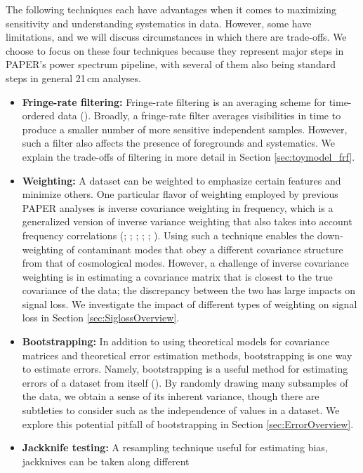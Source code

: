 \documentclass[preprint2,numberedappendix,tighten]{aastex6}
\begin{document}
The following techniques each have advantages when it comes to maximizing sensitivity and understanding systematics in 
data. However, some have limitations, and we will discuss circumstances in which there are trade-offs. We choose to focus on 
these four techniques because they represent major steps in PAPER's power spectrum pipeline, with several of them also 
being standard steps in general 21\,cm analyses.
\begin{itemize}
\item \textbf{Fringe-rate filtering:} Fringe-rate filtering is an averaging scheme for time-ordered data 
(\citealt{parsons_et_al2016}). Broadly, a fringe-rate filter averages visibilities in time to produce a smaller number of more sensitive 
independent samples. However, such a filter also affects the presence 
of foregrounds and systematics. We explain the trade-offs of filtering in more detail in Section \ref{sec:toymodel_frf}.
\item \textbf{Weighting:} A dataset can be weighted to emphasize certain features and minimize others. One particular flavor of 
weighting employed by previous PAPER analyses is inverse covariance weighting in frequency, which is a generalized version of inverse variance 
weighting that also takes into account frequency correlations (\citealt{liu_tegmark2011}; \citealt{dillon_et_al2013a}; \citealt{liu_et_al2014a}; \citealt{liu_et_al2014b}; \citealt{dillon_et_al2014}; \citealt{dillon_et_al2015}). Using such a technique enables the down-weighting of contaminant modes that obey a different covariance structure from that of cosmological modes. However, a challenge of inverse covariance 
weighting is in estimating a covariance matrix that is closest to the true covariance of the data; the discrepancy between the two has large impacts on signal loss. We investigate the impact of different types of weighting on signal loss in Section \ref{sec:SiglossOverview}.
\item \textbf{Bootstrapping:} In addition to using theoretical models for covariance matrices and theoretical error estimation 
methods, bootstrapping is one way to estimate errors. Namely, bootstrapping is a useful method for estimating errors of a dataset from 
itself (\citealt{andrae2010}). By randomly drawing many subsamples of the data, we obtain a sense of its inherent variance, though there are subtleties to 
consider such as the independence of values in a dataset. We explore this potential pitfall of bootstrapping in Section \ref{sec:ErrorOverview}.
\item \textbf{Jackknife testing:} A resampling technique useful for estimating bias, jackknives can be taken along different 

\end{itemize}
\end{document}
